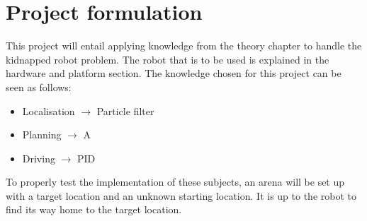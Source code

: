 \section{Project formulation}
This project will entail applying knowledge from the theory chapter to handle the kidnapped robot problem. The robot that is to be used is explained in the hardware and platform section. The knowledge chosen for this project can be seen as follows:
\begin{itemize}
\item Localisation $\rightarrow$ Particle filter
\item Planning $\rightarrow$ A\*
\item Driving $\rightarrow$ PID
\end{itemize}
To properly test the implementation of these subjects, an arena will be set up with a target location and an unknown starting location. It is up to the robot to find its way home to the target location.